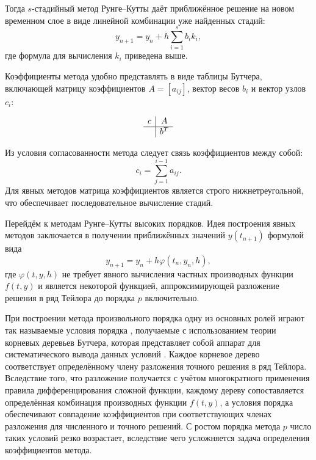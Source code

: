 Тогда $s$-стадийный метод Рунге--Кутты даёт приближённое решение на новом временном слое в виде линейной комбинации уже найденных стадий:
\begin{equation*}
	y_{n + 1} = y_n + h \sum_{i = 1}^s b_i k_i,
\end{equation*}
где формула для вычисления $k_i$ приведена выше.

Коэффициенты метода удобно представлять в виде таблицы Бутчера, включающей матрицу коэффициентов $A = [a_{ij}]$, вектор весов $b_i$ и вектор узлов $c_i$:

\begin{equation}\label{eq:Butcher_tableau}
	\begin{array}{c|c}
		c & A \\
		\hline
		& b^T
	\end{array}
\end{equation}

Из условия согласованности метода следует связь коэффициентов между собой: 
\begin{equation*}
	c_i = \sum_{j = 1}^{i - 1}a_{ij}.
\end{equation*}
Для явных методов матрица коэффициентов является строго нижнетреугольной, что обеспечивает последовательное вычисление стадий.

Перейдём к методам Рунге--Кутты высоких порядков. Идея построения явных методов заключается в получении приближённых значений $y(t_{n + 1})$ формулой вида
\begin{equation} \label{eq:RK_formula}
	y_{n + 1} = y_n + h \varphi(t_n, y_n, h),
\end{equation}
где $\varphi(t, y, h)$ не требует явного вычисления частных производных функции $f(t, y)$ и является некоторой функцией, аппроксимирующей разложение решения в ряд Тейлора до порядка $p$ включительно. 

При построении метода произвольного порядка одну из основных ролей играют так называемые условия порядка \cite{Hairer1993}, получаемые с использованием теории корневых деревьев Бутчера, которая представляет собой аппарат для систематического вывода данных условий \cite{Butcher2008}. Каждое корневое дерево соответствует определённому члену разложения точного решения в ряд Тейлора. Вследствие того, что разложение получается с учётом многократного применения правила дифференцирования сложной функции, каждому дереву сопоставляется определённая комбинация производных функции $f(t, y)$, а условия порядка обеспечивают совпадение коэффициентов при соответствующих членах разложения для численного и точного решений. С ростом порядка метода $p$ число таких условий резко возрастает, вследствие чего усложняется задача определения коэффициентов метода. 

